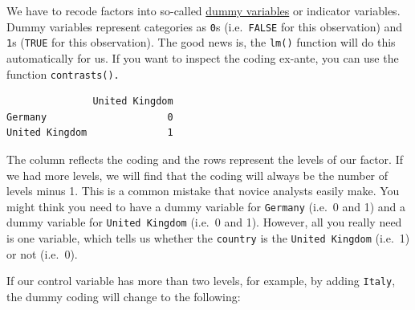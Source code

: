 \documentclass[
  letterpaper,
  DIV=11,
  numbers=noendperiod]{scrreprt}
\newenvironment{Shaded}{\begin{snugshade}}{\end{snugshade}}
\newcommand{\FunctionTok}[1]{\textcolor[rgb]{0.28,0.35,0.67}{#1}}
\newcommand{\NormalTok}[1]{\textcolor[rgb]{0.00,0.23,0.31}{#1}}
\newcommand{\OtherTok}[1]{\textcolor[rgb]{0.00,0.23,0.31}{#1}}
\newcommand{\SpecialCharTok}[1]{\textcolor[rgb]{0.37,0.37,0.37}{#1}}
\newcommand{\StringTok}[1]{\textcolor[rgb]{0.13,0.47,0.30}{#1}}
\begin{document}
We have to recode factors into so-called
\href{https://methods.sagepub.com/reference/the-sage-encyclopedia-of-educational-research-measurement-and-evaluation/i7682.xml?fromsearch=true}{dummy
variables} or indicator variables. Dummy variables represent categories
as \texttt{0}s (i.e.~\texttt{FALSE} for this observation) and
\texttt{1}s (\texttt{TRUE} for this observation). The good news is, the
\texttt{lm()} function will do this automatically for us. If you want to
inspect the coding ex-ante, you can use the function
\texttt{contrasts().}

\begin{Shaded}
\end{Shaded}

\begin{verbatim}
               United Kingdom
Germany                     0
United Kingdom              1
\end{verbatim}

The column reflects the coding and the rows represent the levels of our
factor. If we had more levels, we will find that the coding will always
be the number of levels minus 1. This is a common mistake that novice
analysts easily make. You might think you need to have a dummy variable
for \texttt{Germany} (i.e.~0 and 1) and a dummy variable for
\texttt{United\ Kingdom} (i.e.~0 and 1). However, all you really need is
one variable, which tells us whether the \texttt{country} is the
\texttt{United\ Kingdom} (i.e.~1) or not (i.e.~0).

If our control variable has more than two levels, for example, by adding
\texttt{Italy}, the dummy coding will change to the following:

\begin{Shaded}
\end{Shaded}
\end{document}
